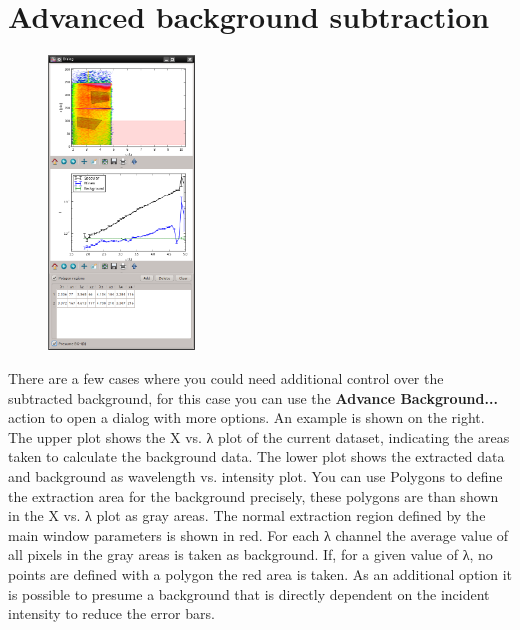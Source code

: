   \section{Advanced background subtraction}
    \begin{figure}
    \centering 
    \includegraphics[width=110pt]{screenshots/advancedBackground.png}
    \end{figure}
    There are a few cases where you could need additional control over the subtracted background, for this case you can use the \textbf{Advance Background...} action to open a dialog with more options.
    An example is shown on the right. 
    The upper plot shows the X vs. λ plot of the current dataset, indicating the areas taken to calculate the background data.
    The lower plot shows the extracted data and background as wavelength vs. intensity plot.
    You can use Polygons to define the extraction area for the background precisely, these polygons are than shown in the X vs. λ plot as gray areas. 
    The normal extraction region defined by the main window parameters is shown in red. 
    For each λ channel the average value of all pixels in the gray areas is taken as background. 
    If, for a given value of λ, no points are defined with a polygon the red area is taken.
    As an additional option it is possible to presume a background that is directly dependent on the incident intensity to reduce the error bars.
  
